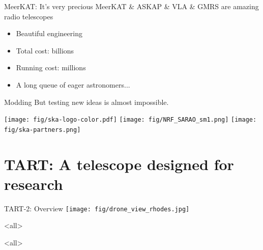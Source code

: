 \documentclass[ignorenonframetext]{beamer}
\begin{document}
% 


\begin{frame}{MeerKAT: It's very precious}
MeerKAT \& ASKAP \& VLA \& GMRS are amazing radio telescopes
\begin{itemize}
\item Beautiful engineering
\item Total cost: billions
\item Running cost: millions
\item A long queue of eager astronomers...
\end{itemize}

\begin{block}{Modding}
 But testing new ideas is almost impossible.
\end{block}

\texttt{[image: fig/ska-logo-color.pdf]}
\texttt{[image: fig/NRF\_SARAO\_sm1.png]}
\texttt{[image: fig/ska-partners.png]}
\end{frame}

\section{TART: A telescope designed for research}

\frame{\tableofcontents[currentsection]}

% 
% 



\begin{frame}{TART-2: Overview}
   \texttt{[image: fig/drone\_view\_rhodes.jpg]}
\end{frame}




\mode<all>
{
\begin{frame}[plain]
\end{frame}
}
\mode<all>{\usebackgroundtemplate{}}
\end{document}
